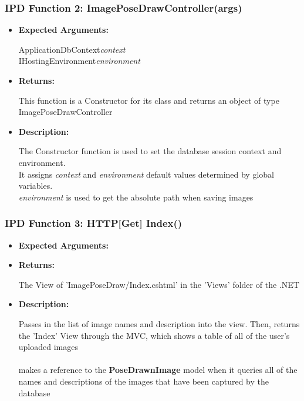 \documentclass{scrreprt}
\begin{document}
\subsubsection{IPD Function 2: ImagePoseDrawController(args)}
\begin{itemize}
    \item \textbf{Expected Arguments:}

    ApplicationDbContext\quad\textit{context}
    \\
    IHostingEnvironment\quad\textit{environment}

    \item \textbf{Returns:}

    This function is a Constructor for its class and returns an object of type ImagePoseDrawController

    \item \textbf{Description:}

    The Constructor function is used to set the database session context and environment.
    \\
    It assigns \textit{context} and \textit{environment} default values determined by global variables.
    \\
    \textit{environment} is used to get the absolute path when saving images
\end{itemize}


\subsubsection{IPD Function 3: HTTP[Get] Index()}
\begin{itemize}
    \item \textbf{Expected Arguments:}

    \item \textbf{Returns:}

    The View of 'ImagePoseDraw/Index.cshtml' in the 'Views' folder of the .NET

    \item \textbf{Description:}

    Passes in the list of image names and description into the view. Then, returns the 'Index' View through the MVC, which shows a table of all of the user's uploaded images
    \\\\
    makes a reference to the \textbf{PoseDrawnImage} model when it queries all of the names and descriptions of the images that have been captured by the database
\end{itemize}
\end{document}
